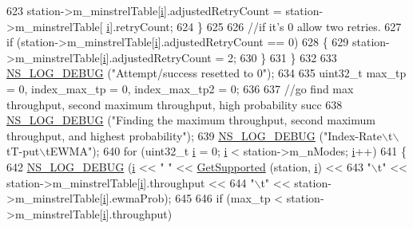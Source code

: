 \begin{DoxyCode}
{623           station->m\_minstrelTable[\hyperlink{bernuolliDistribution_8m_a6f6ccfcf58b31cb6412107d9d5281426}{i}].adjustedRetryCount = station->m\_minstrelTable[
      \hyperlink{bernuolliDistribution_8m_a6f6ccfcf58b31cb6412107d9d5281426}{i}].retryCount;
624         \}
625 
626       \textcolor{comment}{//if it's 0 allow two retries.}
627       \textcolor{keywordflow}{if} (station->m\_minstrelTable[\hyperlink{bernuolliDistribution_8m_a6f6ccfcf58b31cb6412107d9d5281426}{i}].adjustedRetryCount == 0)
628         \{
629           station->m\_minstrelTable[\hyperlink{bernuolliDistribution_8m_a6f6ccfcf58b31cb6412107d9d5281426}{i}].adjustedRetryCount = 2;
630         \}
631     \}
632 
633   \hyperlink{group__logging_ga413f1886406d49f59a6a0a89b77b4d0a}{NS\_LOG\_DEBUG} (\textcolor{stringliteral}{"Attempt/success resetted to 0"});
634 
635   uint32\_t max\_tp = 0, index\_max\_tp = 0, index\_max\_tp2 = 0;
636 
637   \textcolor{comment}{//go find max throughput, second maximum throughput, high probability succ}
638   \hyperlink{group__logging_ga413f1886406d49f59a6a0a89b77b4d0a}{NS\_LOG\_DEBUG} (\textcolor{stringliteral}{"Finding the maximum throughput, second maximum throughput, and highest
       probability"});
639   \hyperlink{group__logging_ga413f1886406d49f59a6a0a89b77b4d0a}{NS\_LOG\_DEBUG} (\textcolor{stringliteral}{"Index-Rate\(\backslash\)t\(\backslash\)tT-put\(\backslash\)tEWMA"});
640   \textcolor{keywordflow}{for} (uint32\_t \hyperlink{bernuolliDistribution_8m_a6f6ccfcf58b31cb6412107d9d5281426}{i} = 0; \hyperlink{bernuolliDistribution_8m_a6f6ccfcf58b31cb6412107d9d5281426}{i} < station->m\_nModes; \hyperlink{bernuolliDistribution_8m_a6f6ccfcf58b31cb6412107d9d5281426}{i}++)
641     \{
642       \hyperlink{group__logging_ga413f1886406d49f59a6a0a89b77b4d0a}{NS\_LOG\_DEBUG} (\hyperlink{bernuolliDistribution_8m_a6f6ccfcf58b31cb6412107d9d5281426}{i} << \textcolor{stringliteral}{" "} << \hyperlink{classns3_1_1WifiRemoteStationManager_a995c8bae0d84b168fd3e8bc9ecaacdd4}{GetSupported} (station, 
      \hyperlink{bernuolliDistribution_8m_a6f6ccfcf58b31cb6412107d9d5281426}{i}) <<
643                     \textcolor{stringliteral}{"\(\backslash\)t"} << station->m\_minstrelTable[\hyperlink{bernuolliDistribution_8m_a6f6ccfcf58b31cb6412107d9d5281426}{i}].throughput <<
644                     \textcolor{stringliteral}{"\(\backslash\)t"} << station->m\_minstrelTable[\hyperlink{bernuolliDistribution_8m_a6f6ccfcf58b31cb6412107d9d5281426}{i}].ewmaProb);
645 
646       \textcolor{keywordflow}{if} (max\_tp < station->m\_minstrelTable[\hyperlink{bernuolliDistribution_8m_a6f6ccfcf58b31cb6412107d9d5281426}{i}].throughput)
}
\end{DoxyCode}
